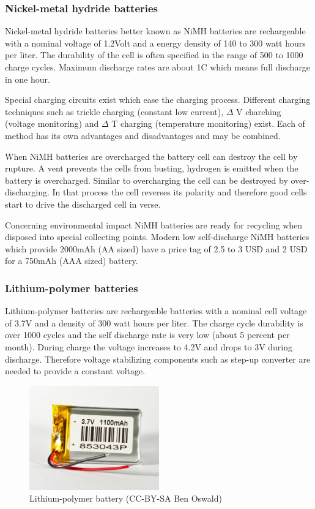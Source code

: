\documentclass[11pt,a4paper]{article}
\begin{document}
\subsubsection{Nickel-metal hydride batteries}
Nickel-metal hydride batteries better known as NiMH batteries are rechargeable with a nominal voltage of 1.2Volt and a energy density of 140 to 300 watt hours per liter. The durability of the cell is often specified in the range of 500 to 1000 charge cycles. Maximum discharge rates are about 1C which means full discharge in one hour.

Special charging circuits exist which ease the charging process. Different charging techniques such as trickle charging (constant low current), $\Delta$ V charching (voltage monitoring) and $\Delta$ T charging (temperature monitoring) exist. Each of method has its own advantages and disadvantages and may be combined.

When NiMH batteries are overcharged the battery cell can destroy the cell by rupture. A vent prevents the cells from busting, hydrogen is emitted when the battery is overcharged. Similar to overcharging the cell can be destroyed by over-discharging. In that process the cell reverses its polarity and therefore good cells start to drive the discharged cell in verse.

Concerning environmental impact NiMH batteries are ready for recycling when disposed into special collecting points. Modern low self-discharge NiMH batteries which provide 2000mAh (AA sized) have a price tag of 2.5 to 3 USD and 2 USD for a 750mAh (AAA sized) battery. 
\subsubsection{Lithium-polymer batteries}
Lithium-polymer batteries are rechargeable batteries with a nominal cell voltage of 3.7V  and a density of 300 watt hours per liter. The charge cycle durability is over 1000 cycles and the self discharge rate is very low (about 5 percent per month). During charge the voltage increases to 4.2V and drops to 3V during discharge. Therefore voltage stabilizing components such as step-up converter are needed to provide a constant voltage.

\begin{figure}[h!]
  \centering
  \includegraphics[width=0.5\textwidth]{images/30_lithium-polymer.jpg}
  \caption{Lithium-polymer battery (CC-BY-SA Ben Oswald)}
\end{figure}
\end{document}
